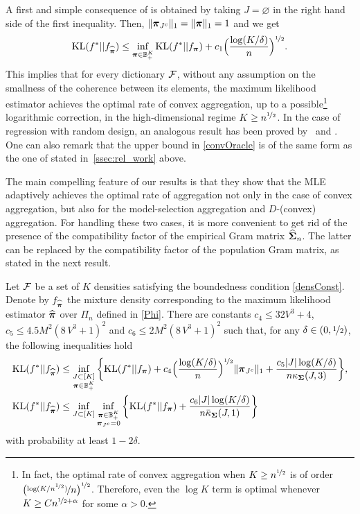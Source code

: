 A first and simple consequence of  is obtained by taking $J=\varnothing$ in the right hand
side of the first inequality. Then, $\|\boldsymbol \pi_{J^c}\|_1=\|\boldsymbol \pi\|_1=1$ and we get
\begin{equation}
{\rm KL}(f^*|| f_{\widehat{\boldsymbol \pi}}) \leq \inf_{\boldsymbol \pi \in {\mathbb B}_+^K}
{\rm KL}(f^*|| f_{\boldsymbol \pi}) + c_1\Big(\frac{\log(K/\delta)}{n}\Big)^{\nicefrac12}.\label{convOracle}
\end{equation}
This implies that for every dictionary $\cal F$, without any assumption on the smallness of the coherence 
between its elements, the maximum likelihood estimator achieves the optimal rate of convex aggregation, up
to a possible\footnote{In fact, the optimal rate of convex aggregation when $K\ge n^{\nicefrac12}$ is of
	order $\normalsize\big(\nicefrac{\log(K/n^{\nicefrac12})}{\displaystyle n}\big)^{\nicefrac12}$. Therefore, even the 
	$\log K$ term is optimal whenever $K\ge C n^{\nicefrac12+\alpha}$ for some $\alpha>0$.} logarithmic 
correction, in the high-dimensional regime $K\ge n^{\nicefrac12}$. In the case of regression with random 
design, an analogous result has been proved by~\cite{LecueMend13} and \cite{Lecue13}. 
One can also remark that the upper bound in \eqref{convOracle} is of the same form as the one of  
stated in~\cref{ssec:rel_work} above.

The main compelling feature  of our results is that they show that the MLE adaptively achieves the optimal rate of
aggregation not only in the case of convex aggregation, but also for the model-selection aggregation and $D$-(convex)
aggregation. For handling these two cases, it is more convenient to get rid of the presence of the compatibility
factor of the empirical Gram matrix $\widehat{\boldsymbol\Sigma}_n$.  The latter can be replaced by the compatibility factor of
the population Gram matrix, as stated in the next result.

\begin{theorem}
	\label{maintheo2}
	Let $\cal F$ be a set of $K$ densities satisfying the boundedness condition \eqref{densConst}.
	Denote by $f_{\widehat{\boldsymbol \pi}}$ the mixture density corresponding to the maximum likelihood estimator
	$\widehat{\boldsymbol \pi}$ over $\Pi_n$ defined in \eqref{Phi}. There are constants $c_4\le 32V^3 + 4$,
	$c_5\le 4.5M^2(8\,V^3+1)^2$ and $c_6\le 2M^2(8\,V^3+1)^2$ such that, for any
	$\delta \in (0,\nicefrac12)$, the following inequalities hold
	\begin{align}
	{\rm KL}(f^*|| f_{\widehat{\boldsymbol \pi}}) &\leq \inf_{\substack{J\subset [K]\\ \boldsymbol \pi \in {\mathbb B}_+^K}}
	\bigg\{ {\rm KL}(f^*|| f_{\boldsymbol \pi}) + c_4\Big(\frac{\log(K/\delta)}{n}\Big)^{\nicefrac12} \|\boldsymbol \pi_{J^c}\|_1 +
	\frac{c_5|J|\log(K/\delta)}{n\kappa_{\boldsymbol\Sigma}(J,3)} \bigg\},\label{boundDevThree}\\
	{\rm KL}(f^*|| f_{\widehat{\boldsymbol \pi}}) &\leq \inf_{J\subset [K]}\inf_{\substack{\boldsymbol \pi \in {\mathbb B}_+^K\\ \boldsymbol \pi_{J^c}=0}}
	\bigg\{ {\rm KL}(f^*|| f_{\boldsymbol \pi}) +
	\frac{c_6|J|\log(K/\delta)}{n\bar\kappa_{\boldsymbol\Sigma}(J,1)} \bigg\}\label{boundDevFour}
	\end{align}
	with probability at least $1-2\delta$.
\end{theorem}

